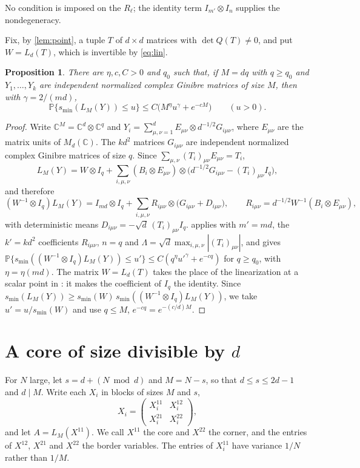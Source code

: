 \documentclass[11pt]{article}
\newtheorem{proposition}[theorem]{Proposition}
\theoremstyle{remark}
\newcommand{\C}{\mathbb C}
\newcommand{\Prob}{\mathbb P}
\newcommand{\smin}{s_{\min}}
\begin{document}
No condition is imposed on the $R_\ell$; the identity term $I_{m'}\otimes I_n$ supplies the nondegeneracy.

Fix, by \cref{lem:point}, a tuple $T$ of $d\times d$ matrices with $\det Q(T)\ne0$, and put $W=L_d(T)$, which is invertible by \eqref{eq:lin}.

\begin{proposition}\label{prop:divisible}
There are $\eta,c,C>0$ and $q_0$ such that, if $M=dq$ with $q\ge q_0$ and $Y_1,\dots,Y_k$ are independent normalized complex Ginibre matrices of size $M$, then with $\gamma=2/(md)$,
\[
\Prob\{\smin(L_M(Y))\le u\}\le C\bigl(M^{\eta}u^{\gamma}+e^{-cM}\bigr)\qquad(u>0).
\]
\end{proposition}

\begin{proof}
Write $\C^M=\C^d\otimes\C^q$ and $Y_i=\sum_{\mu,\nu=1}^dE_{\mu\nu}\otimes d^{-1/2}G_{i\mu\nu}$, where $E_{\mu\nu}$ are the matrix units of $M_d(\C)$. The $kd^2$ matrices $G_{i\mu\nu}$ are independent normalized complex Ginibre matrices of size $q$. Since $\sum_{\mu,\nu}(T_i)_{\mu\nu}E_{\mu\nu}=T_i$,
\[
L_M(Y)=W\otimes I_q+\sum_{i,\mu,\nu}(B_i\otimes E_{\mu\nu})\otimes\bigl(d^{-1/2}G_{i\mu\nu}-(T_i)_{\mu\nu}I_q\bigr),
\]
and therefore
\[
(W^{-1}\otimes I_q)L_M(Y)=I_{md}\otimes I_q+\sum_{i,\mu,\nu}R_{i\mu\nu}\otimes\bigl(G_{i\mu\nu}+D_{i\mu\nu}\bigr),\qquad R_{i\mu\nu}=d^{-1/2}W^{-1}(B_i\otimes E_{\mu\nu}),
\]
with deterministic means $D_{i\mu\nu}=-\sqrt d\,(T_i)_{\mu\nu}I_q$.  applies with $m'=md$, the $k'=kd^2$ coefficients $R_{i\mu\nu}$, $n=q$ and $\Lambda=\sqrt d\max_{i,\mu,\nu}|(T_i)_{\mu\nu}|$, and gives $\Prob\{\smin((W^{-1}\otimes I_q)L_M(Y))\le u'\}\le C(q^{\eta}u'^{\gamma}+e^{-cq})$ for $q\ge q_0$, with $\eta=\eta(md)$. The matrix $W=L_d(T)$ takes the place of the linearization at a scalar point in \cite{CKMYZ}: it makes the coefficient of $I_q$ the identity. Since $\smin(L_M(Y))\ge\smin(W)\,\smin((W^{-1}\otimes I_q)L_M(Y))$, we take $u'=u/\smin(W)$ and use $q\le M$, $e^{-cq}=e^{-(c/d)M}$.
\end{proof}

\section{\texorpdfstring{A core of size divisible by $d$}{A core of size divisible by d}}\label{sec:variance}

For $N$ large, let $s=d+(N\bmod d)$ and $M=N-s$, so that $d\le s\le 2d-1$ and $d\mid M$. Write each $X_i$ in blocks of sizes $M$ and $s$,
\[
X_i=\begin{pmatrix}X_i^{11}&X_i^{12}\\ X_i^{21}&X_i^{22}\end{pmatrix},
\]
and let $A=L_M(X^{11})$. We call $X^{11}$ the core and $X^{22}$ the corner, and the entries of $X^{12}$, $X^{21}$ and $X^{22}$ the border variables. The entries of $X^{11}_i$ have variance $1/N$ rather than $1/M$.
\end{document}
